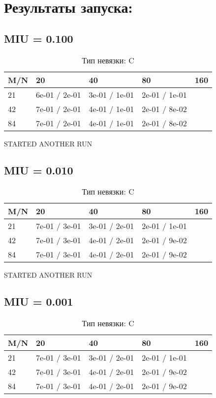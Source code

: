 \documentclass[a4paper,11pt]{article}
\begin{document}
\section{Результаты запуска:}
\subsection{MIU = 0.100}
\begin{table}[H]
\caption {Тип невязки: C   }
\begin{center}
\begin{tabular}{l|l|l|l|l}
\hline
M/N  & 20 & 40 & 80 & 160 \\ \hline
  21 & 6e-01 / 2e-01& 3e-01 / 1e-01& 2e-01 / 1e-01\\ \hline
  42 & 7e-01 / 2e-01& 4e-01 / 1e-01& 2e-01 / 8e-02\\ \hline
  84 & 7e-01 / 2e-01& 4e-01 / 1e-01& 2e-01 / 8e-02\\ \hline
\end{tabular}
\end{center}
\end{table}
STARTED ANOTHER RUN



\subsection{MIU = 0.010}
\begin{table}[H]
\caption {Тип невязки: C   }
\begin{center}
\begin{tabular}{l|l|l|l|l}
\hline
M/N  & 20 & 40 & 80 & 160 \\ \hline
  21 & 7e-01 / 3e-01& 3e-01 / 2e-01& 2e-01 / 1e-01\\ \hline
  42 & 7e-01 / 3e-01& 4e-01 / 2e-01& 2e-01 / 9e-02\\ \hline
  84 & 7e-01 / 3e-01& 4e-01 / 2e-01& 2e-01 / 9e-02\\ \hline
\end{tabular}
\end{center}
\end{table}
STARTED ANOTHER RUN



\subsection{MIU = 0.001}
\begin{table}[H]
\caption {Тип невязки: C   }
\begin{center}
\begin{tabular}{l|l|l|l|l}
\hline
M/N  & 20 & 40 & 80 & 160 \\ \hline
  21 & 7e-01 / 3e-01& 3e-01 / 2e-01& 2e-01 / 1e-01\\ \hline
  42 & 7e-01 / 3e-01& 4e-01 / 2e-01& 2e-01 / 9e-02\\ \hline
  84 & 7e-01 / 3e-01& 4e-01 / 2e-01& 2e-01 / 9e-02\\ \hline
\end{tabular}
\end{center}
\end{table}
\end{document}
